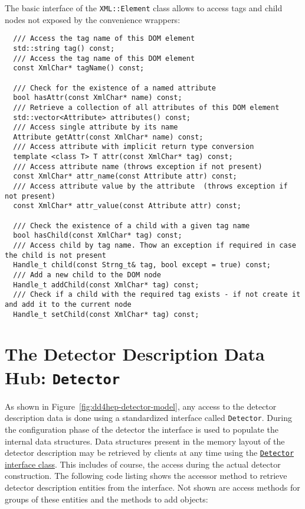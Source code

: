 The basic interface of the \texttt{XML::Element} class allows to access tags and child nodes not exposed by the convenience wrappers:
\begin{verbatim}
  /// Access the tag name of this DOM element
  std::string tag() const;
  /// Access the tag name of this DOM element
  const XmlChar* tagName() const;

  /// Check for the existence of a named attribute
  bool hasAttr(const XmlChar* name) const;
  /// Retrieve a collection of all attributes of this DOM element
  std::vector<Attribute> attributes() const;
  /// Access single attribute by its name
  Attribute getAttr(const XmlChar* name) const;
  /// Access attribute with implicit return type conversion
  template <class T> T attr(const XmlChar* tag) const;
  /// Access attribute name (throws exception if not present)
  const XmlChar* attr_name(const Attribute attr) const;
  /// Access attribute value by the attribute  (throws exception if not present)
  const XmlChar* attr_value(const Attribute attr) const;

  /// Check the existence of a child with a given tag name
  bool hasChild(const XmlChar* tag) const;
  /// Access child by tag name. Thow an exception if required in case the child is not present
  Handle_t child(const Strng_t& tag, bool except = true) const;
  /// Add a new child to the DOM node
  Handle_t addChild(const XmlChar* tag) const;
  /// Check if a child with the required tag exists - if not create it and add it to the current node
  Handle_t setChild(const XmlChar* tag) const;
\end{verbatim}

\section{The Detector Description Data Hub: \texttt{Detector}}
\label{sec:dd4hep-user-manual-LCDD-hub}
As shown in Figure~\ref{fig:dd4hep-detector-model}, any access to the detector  description data is done using a standardized interface called \texttt{Detector}. During the configuration phase of the detector the interface is used to populate the internal data structures. Data structures present in the memory layout of the detector description may be retrieved by clients at any time using the  \href{https://dd4hep.web.cern.ch/dd4hep/reference/classdd4hep_1_1Detector.html}{\texttt{Detector} interface class}. This includes of course, the access during the actual detector construction. The following code listing shows the accessor method to retrieve  detector description entities from the interface. Not shown are access methods for groups of these entities and the methods to add objects:

